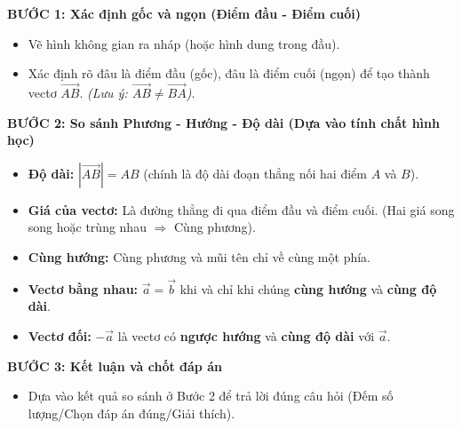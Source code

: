 \documentclass[12pt,a4paper]{article}
\begin{document}
\begin{tcolorbox}[colback=green!5!white, colframe=mygreen, title=\textbf{KHỐI 2: QUY TRÌNH 3 BƯỚC GIẢI CHUẨN (Step-by-Step Checklist)}]
    \textbf{BƯỚC 1: Xác định gốc và ngọn (Điểm đầu - Điểm cuối)}
    \begin{itemize}[leftmargin=*, label=-]
        \item Vẽ hình không gian ra nháp (hoặc hình dung trong đầu).
        \item Xác định rõ đâu là điểm đầu (gốc), đâu là điểm cuối (ngọn) để tạo thành vectơ \(\overrightarrow{AB}\). \textit{(Lưu ý: \(\overrightarrow{AB} \neq \overrightarrow{BA}\))}.
    \end{itemize}
    
    \textbf{BƯỚC 2: So sánh Phương - Hướng - Độ dài (Dựa vào tính chất hình học)}
    \begin{itemize}[leftmargin=*, label=-]
        \item \textbf{Độ dài:} \(|\overrightarrow{AB}| = AB\) (chính là độ dài đoạn thẳng nối hai điểm \(A\) và \(B\)).
        \item \textbf{Giá của vectơ:} Là đường thẳng đi qua điểm đầu và điểm cuối. (Hai giá song song hoặc trùng nhau $\Rightarrow$ Cùng phương).
        \item \textbf{Cùng hướng:} Cùng phương và mũi tên chỉ về cùng một phía.
        \item \textbf{Vectơ bằng nhau:} \(\vec{a} = \vec{b}\) khi và chỉ khi chúng \textbf{cùng hướng} và \textbf{cùng độ dài}.
        \item \textbf{Vectơ đối:} \(-\vec{a}\) là vectơ có \textbf{ngược hướng} và \textbf{cùng độ dài} với \(\vec{a}\).
    \end{itemize}
    
    \textbf{BƯỚC 3: Kết luận và chốt đáp án}
    \begin{itemize}[leftmargin=*, label=-]
        \item Dựa vào kết quả so sánh ở Bước 2 để trả lời đúng câu hỏi (Đếm số lượng/Chọn đáp án đúng/Giải thích).
    \end{itemize}
\end{tcolorbox}
\end{document}
